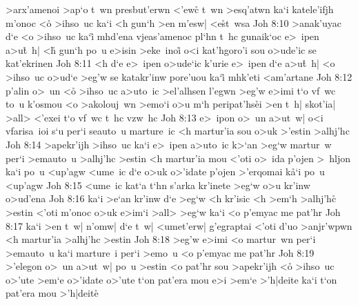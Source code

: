 >arx'amenoi
>ap`o
t~wn
presbut'erwn
<'ewc\r{}
t~wn
>esq'atwn
ka`i
katele'ifjh
m'onoc
<o\r{}
>ihso~uc
ka`i
<h
gun`h
>en
m'esw|
<e\r{s}t~wsa\bibvsend
{}
\vs Joh 8:10
>anak'uyac
d`e
<o
>ihso~uc
ka`i\r{}
mhd'ena
vjeas'amenoc
pl`hn
t~hc
gunaik`oc
e>~ipen
a>u\r{t}~h|
<h\r{}
gun`h
po~u
e>isin
>eke~inoi\r{}
o<i
kat'hgoro'i
sou
o>ude'ic
se
kat'ekrinen\bibvsend
\vs Joh 8:11
<h
d`e
e>~ipen
o>ude`ic
k'urie
e>~ipen
d`e
a>u\r{t}~h|
<o
>ihso~uc
o>ud`e
>eg'w
se
katakr'inw
pore'uou
ka`i\r{}
mhk'eti
<am'artane\bibvsend
\vs Joh 8:12
p'alin
o>~un
<o\r{}
>ihso~uc
a>uto~ic
>el'alhsen
l'egwn
>eg'w
e>imi
t`o
vf~wc
to~u
k'osmou
<o
>akolouj~wn
>emo`i
o>u
m`h
peripat'hs\r{e}i
>en
t~h|
skot'ia|
>all>
<'exei
t`o
vf~wc
t~hc
vzw~hc\bibvsend
\vs Joh 8:13
e>~ipon
o>~un
a>ut~w|
o<i
vfarisa~ioi
s`u
per`i
seauto~u
marture~ic
<h
martur'ia
sou
o>uk
>'estin
>alhj'hc\bibvsend
\vs Joh 8:14
>apekr'ijh
>ihso~uc
ka`i
e>~ipen
a>uto~ic
k>`an
>eg`w
martur~w
per`i
>emauto~u
>alhj'hc
>estin
<h
martur'ia
mou
<'oti
o>~ida
p'ojen
>~hljon
ka`i
po~u
<up'agw
<ume~ic
d`e
o>uk
o>'idate
p'ojen
>'erqomai
k\r{a}`i
po~u
<up'agw\bibvsend
\vs Joh 8:15
<ume~ic
kat`a
t`hn
s'arka
kr'inete
>eg`w
o>u
kr'inw
o>ud'ena\bibvsend
\vs Joh 8:16
ka`i
>e`an
kr'inw
d`e
>eg`w
<h
kr'isic
<h
>em`h
>alhj'h\r{c}
>estin
<'oti
m'onoc
o>uk
e>im`i
>all>
>eg`w
ka`i
<o
p'emyac
me
pat'hr\bibvsend
\vs Joh 8:17
ka`i
>en
t~w|
n'omw|
d`e
t~w|
<umet'erw|
g'egraptai
<'oti
d'uo
>anjr'wpwn
<h
martur'ia
>alhj'hc
>estin\bibvsend
\vs Joh 8:18
>eg'w
e>imi
<o
martur~wn
per`i
>emauto~u
ka`i
marture~i
per`i
>emo~u
<o
p'emyac
me
pat'hr\bibvsend
\vs Joh 8:19
>'elegon
o>~un
a>ut~w|
po~u
>estin
<o
pat'hr
sou
>apekr'ijh
<o\r{}
>ihso~uc
o>'ute
>em`e
o>'idate
o>'ute
t`on
pat'era
mou
e>i
>em`e
>'h|deite
ka`i
t`on
pat'era
mou
>'h|deite\r{}
